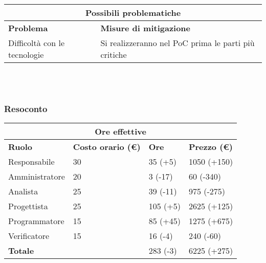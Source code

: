\documentclass[a4paper, 12pt]{article}
\begin{document}
\begin{center}
    \begin{tabularx}{\textwidth}{|X|X|}
        \hline
        \multicolumn{2}{|c|}{\textbf{Possibili problematiche}}\\
        \hline
        \hline
        \textbf{Problema} & \textbf{Misure di mitigazione}\\
        \hline
        Difficoltà con le tecnologie & Si realizzeranno nel PoC prima le parti più critiche\\
        \hline
    \end{tabularx}\\[8pt]
    \mbox{}\\
\end{center}

\subsubsection{Resoconto}\mbox{}

\begin{center}
    \begin{tabularx}{\textwidth}{|X|X|X|X|}
        \hline
        \multicolumn{4}{|c|}{\textbf{Ore effettive}}\\
        \hline
        \hline
        \textbf{Ruolo} & \textbf{Costo orario (\euro)} & \textbf{Ore} & \textbf{Prezzo (\euro)}\\
        \hline
        Responsabile    & 30 & 35 (+5)  & 1050 (+150)\\
        \hline
        Amministratore  & 20 & 3  (-17) & 60 (-340)\\
        \hline
        Analista        & 25 & 39 (-11) & 975 (-275)\\
        \hline
        Progettista     & 25 & 105 (+5) & 2625 (+125)\\
        \hline
        Programmatore   & 15 & 85 (+45) & 1275 (+675)\\
        \hline
        Verificatore    & 15 & 16 (-4)  & 240 (-60)\\
        \hline
        \hline
        \textbf{Totale} &    & 283 (-3) & 6225 (+275)\\
        \hline
    \end{tabularx}\\[8pt]
    \mbox{}\\
\end{center}
\end{document}

